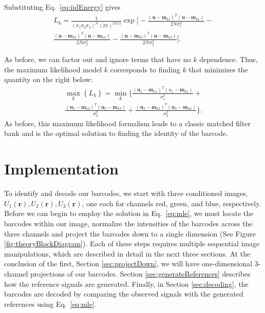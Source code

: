 Substituting Eq.~\ref{eq:iidEnergy} gives
\begin{multline}
L_k=\frac{1}{ (\sigma_1\sigma_2\sigma_3)^N  (2\pi)^{3N/2}  }  \exp\Bigg[ -\frac{(\mathbf{u}-\mathbf{m}_{k1})^T(\mathbf{u}-\mathbf{m}_{k1})} {2 N \sigma_1^2 }   - \\ \frac{(\mathbf{u}-\mathbf{m}_{k2})^T(\mathbf{u}-\mathbf{m}_{k2})} {2 N \sigma_2^2 } -\frac{(\mathbf{u}-\mathbf{m}_{k3})^T(\mathbf{u}-\mathbf{m}_{k3})} {2 N \sigma_3^2 }    \Bigg].
\end{multline}

As before, we can factor out and ignore terms that have no $k$ dependence. Thus, the maximum likelihood model $k$ corresponds to finding $k$ that minimizes the quantity on the right below:
\begin{multline}\label{eq:mle}
\max_k   \left\{ L_k \right\} =  \min_k  \Bigg\{  \frac{(\mathbf{u}_1-\mathbf{m}_{k1})^T(u_1-\mathbf{m}_{k1})}{\sigma_1^2} +\\  
\frac{(\mathbf{u}_2-\mathbf{m}_{k2})^T(\mathbf{u}_2-\mathbf{m}_{k2})}{\sigma_2^2} + \frac{(\mathbf{u}_3-\mathbf{m}_{k3})^T(\mathbf{u}_3-\mathbf{m}_{k3})}{\sigma_3^2} \Bigg\}. 
\end{multline}
As before, this maximum likelihood formalism leads to a classic matched filter bank and is the optimal solution to finding the identity of the barcode.

\section{Implementation}
To identify and decode our barcodes, we start with three conditioned images, $U_1(\mathbf{r}), U_2(\mathbf{r}), U_3(\mathbf{r})$, one each for channels red, green, and blue, respectively.  Before we can begin to employ the solution in Eq.~\ref{eq:mle}, we must locate the barcodes within our image, normalize the intensities of the barcodes across the three channels and project the barcodes down to a single dimension (See Figure \ref{fig:theoryBlockDiagram}). Each of these steps requires multiple sequential image manipulations, which are described in detail in the next three sections. At the conclusion of the first, Section \ref{sec:projectDown}, we will  have one-dimensional 3-channel projections of our barcodes. Section \ref{sec:generateReferences} describes how the reference signals are generated. Finally, in Section \ref{sec:decoding}, the barcodes are decoded by comparing the observed signals with the generated references  using Eq.~\ref{eq:mle}.

